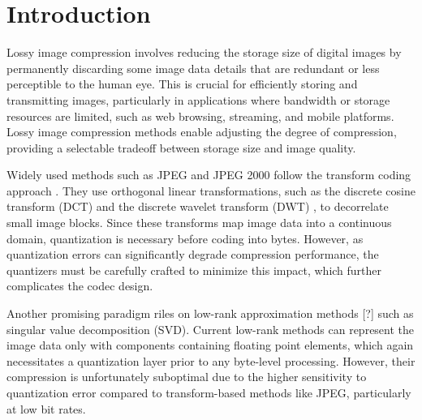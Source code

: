 \section{Introduction} \label{sec: introduction}

Lossy image compression involves reducing the storage size of digital images by permanently discarding some image data details that are redundant or less perceptible to the human eye. This is crucial for efficiently storing and transmitting images, particularly in applications where bandwidth or storage resources are limited, such as web browsing, streaming, and mobile platforms. Lossy image compression methods enable adjusting the degree of compression, providing a selectable tradeoff between storage size and image quality.

Widely used methods such as JPEG \cite{wallace1991jpeg} and JPEG 2000 \cite{skodras2001jpeg} follow the transform coding approach \cite{goyal2001theoretical}. They use orthogonal linear transformations, such as the discrete cosine transform (DCT) \cite{ahmed1974discrete} and the discrete wavelet transform (DWT) \cite{antonini1992image}, to decorrelate small image blocks. Since these transforms map image data into a continuous domain, quantization is necessary before coding into bytes. However, as quantization errors can significantly degrade compression performance, the quantizers must be carefully crafted to minimize this impact, which further complicates the codec design.

Another promising paradigm riles on low-rank approximation methods [?] such as singular value decomposition (SVD). Current low-rank methods can represent the image data only with components containing floating point elements, which again necessitates a quantization layer prior to any byte-level processing. However, their compression is unfortunately suboptimal due to the higher sensitivity to quantization error compared to transform-based methods like JPEG, particularly at low bit rates. 

